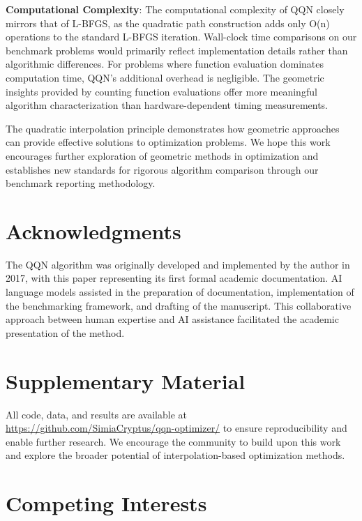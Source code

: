 \textbf{Computational Complexity}: The computational complexity of QQN closely mirrors that of L-BFGS, as the quadratic path construction adds only O(n) operations to the standard L-BFGS iteration.
Wall-clock time comparisons on our benchmark problems would primarily reflect implementation details rather than algorithmic differences.
For problems where function evaluation dominates computation time, QQN's additional overhead is negligible.
The geometric insights provided by counting function evaluations offer more meaningful algorithm characterization than hardware-dependent timing measurements.

The quadratic interpolation principle demonstrates how geometric approaches can provide effective solutions to optimization problems.
We hope this work encourages further exploration of geometric methods in optimization and establishes new standards for rigorous algorithm comparison through our benchmark reporting methodology.

\hypertarget{acknowledgments}{%
\section{Acknowledgments}\label{acknowledgments}}

The QQN algorithm was originally developed and implemented by the author in 2017, with this paper representing its first formal academic documentation.
AI language models assisted in the preparation of documentation, implementation of the benchmarking framework, and drafting of the manuscript.
This collaborative approach between human expertise and AI assistance facilitated the academic presentation of the method.

\hypertarget{supplementary-material}{%
\section{Supplementary Material}\label{supplementary-material}}

All code, data, and results are available at \url{https://github.com/SimiaCryptus/qqn-optimizer/} to ensure reproducibility and enable further research.
We encourage the community to build upon this work and explore the broader potential of interpolation-based optimization methods.

\hypertarget{competing-interests}{%
\section{Competing Interests}\label{competing-interests}}

